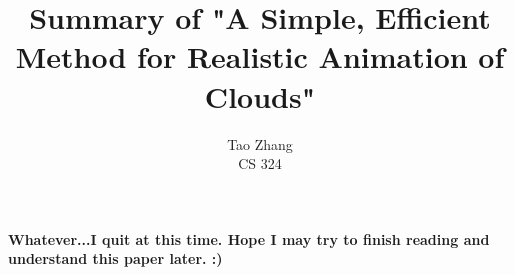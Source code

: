 \documentclass[12pt]{article}
\begin{document}
\title{Summary of "A Simple, Efficient Method for Realistic Animation of Clouds"}

\author{Tao Zhang\\
CS 324}

\maketitle
\paragraph{Whatever...I quit at this time. Hope I may try to finish reading and understand this paper later. :)}
\end{document}

